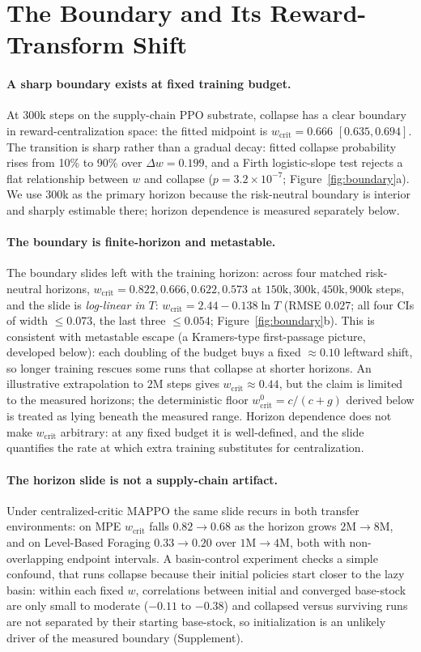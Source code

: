 \documentclass[letterpaper]{article} %
\theoremstyle{plain}
\newcommand{\wcrit}{w_{\mathrm{crit}}}
\begin{document}
\section{The Boundary and Its Reward-Transform Shift}
\label{sec:results}

\paragraph{A sharp boundary exists at fixed training budget.}
At 300k steps on the supply-chain PPO substrate, collapse has a clear boundary in
reward-centralization space: the fitted midpoint is $\wcrit=0.666$ $[0.635,0.694]$. The transition
is sharp rather than a gradual decay: fitted collapse probability rises from 10\% to 90\% over
$\Delta w=0.199$, and a Firth logistic-slope test rejects a flat relationship between $w$ and
collapse ($p=3.2\times10^{-7}$; Figure~\ref{fig:boundary}a). We use 300k as the primary horizon
because the risk-neutral boundary is interior and sharply estimable there; horizon dependence is
measured separately below.

\paragraph{The boundary is finite-horizon and metastable.}
The boundary slides left with the training horizon: across four matched risk-neutral horizons,
$\wcrit=0.822,0.666,0.622,0.573$ at $150\mathrm{k},300\mathrm{k},450\mathrm{k},900\mathrm{k}$
steps, and the slide is \emph{log-linear in $T$}: $\wcrit=2.44-0.138\ln T$ (RMSE $0.027$; all four
CIs of width ${\le}0.073$, the last three ${\le}0.054$; Figure~\ref{fig:boundary}b). This is
consistent with metastable escape (a Kramers-type first-passage picture, developed below): each
doubling of the budget buys a fixed $\approx0.10$ leftward shift, so longer training rescues some
runs that collapse at shorter horizons. An illustrative extrapolation to $2\mathrm{M}$ steps gives
$\wcrit\approx0.44$, but the claim is limited to the measured horizons; the deterministic floor
$\wcrit^0=c/(c+g)$ derived below is treated as lying beneath the measured range. Horizon dependence does not make
$\wcrit$ arbitrary: at any fixed budget it is well-defined, and the slide quantifies the rate at
which extra training substitutes for centralization.

\paragraph{The horizon slide is not a supply-chain artifact.}
Under centralized-critic MAPPO the same slide recurs in both transfer environments: on MPE
$\wcrit$ falls $0.82\to0.68$ as the horizon grows $2\mathrm{M}\to8\mathrm{M}$, and on Level-Based
Foraging $0.33\to0.20$ over $1\mathrm{M}\to4\mathrm{M}$, both with non-overlapping endpoint
intervals. A basin-control experiment checks a simple confound, that runs collapse because their
initial policies start closer to the lazy basin: within each fixed $w$, correlations between
initial and converged base-stock are only small to moderate ($-0.11$ to $-0.38$) and collapsed
versus surviving runs are not separated by their starting base-stock, so initialization is an
unlikely driver of the measured boundary (Supplement).
\end{document}
